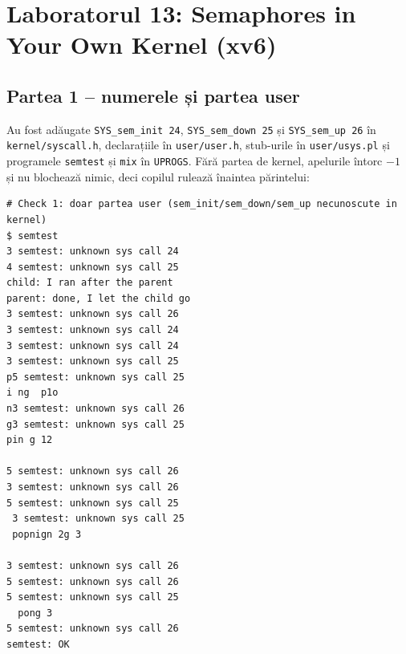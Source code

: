 \documentclass[12pt,a4paper]{article}
\begin{document}
\newpage
\section{Laboratorul 13: Semaphores in Your Own Kernel (xv6)}

\subsection{Partea 1 -- numerele și partea user}
Au fost adăugate \texttt{SYS\_sem\_init 24}, \texttt{SYS\_sem\_down 25} și \texttt{SYS\_sem\_up 26} în \texttt{kernel/syscall.h}, declarațiile în \texttt{user/user.h}, stub-urile în \texttt{user/usys.pl} și programele \texttt{semtest} și \texttt{mix} în \texttt{UPROGS}. Fără partea de kernel, apelurile întorc $-1$ și nu blochează nimic, deci copilul rulează înaintea părintelui:
\begin{lstlisting}[caption={Check 1 -- unknown sys call 24/25/26, child înainte de parent}]
# Check 1: doar partea user (sem_init/sem_down/sem_up necunoscute in kernel)
$ semtest
3 semtest: unknown sys call 24
4 semtest: unknown sys call 25
child: I ran after the parent
parent: done, I let the child go
3 semtest: unknown sys call 26
3 semtest: unknown sys call 24
3 semtest: unknown sys call 24
3 semtest: unknown sys call 25
p5 semtest: unknown sys call 25
i ng  p1o
n3 semtest: unknown sys call 26
g3 semtest: unknown sys call 25
pin g 12

5 semtest: unknown sys call 26
3 semtest: unknown sys call 26
5 semtest: unknown sys call 25
 3 semtest: unknown sys call 25
 popnign 2g 3

3 semtest: unknown sys call 26
5 semtest: unknown sys call 26
5 semtest: unknown sys call 25
  pong 3
5 semtest: unknown sys call 26
semtest: OK
\end{lstlisting}
\end{document}
